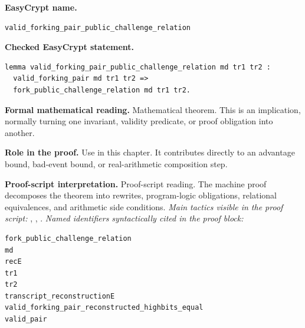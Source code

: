 \begin{formaltheorem}
\noindent\textbf{EasyCrypt name.}
\begin{lstlisting}[language=EasyCrypt,basicstyle=\ttfamily\scriptsize]
valid_forking_pair_public_challenge_relation
\end{lstlisting}
\noindent\textbf{Checked EasyCrypt statement.}
\begin{lstlisting}[language=EasyCrypt,basicstyle=\ttfamily\scriptsize]
lemma valid_forking_pair_public_challenge_relation md tr1 tr2 :
  valid_forking_pair md tr1 tr2 =>
  fork_public_challenge_relation md tr1 tr2.
\end{lstlisting}
\noindent\textbf{Formal mathematical reading.}
Mathematical theorem. This is an implication, normally turning one invariant, validity predicate, or proof obligation into another.

\noindent\textbf{Role in the proof.}
Use in this chapter. It contributes directly to an advantage bound, bad-event bound, or real-arithmetic composition step.

\noindent\textbf{Proof-script interpretation.}
Proof-script reading. The machine proof decomposes the theorem into rewrites, program-logic obligations, relational equivalences, and arithmetic side conditions.
\emph{Main tactics visible in the proof script:} , , .
\emph{Named identifiers syntactically cited in the proof block:}
\begin{lstlisting}[language=EasyCrypt,basicstyle=\ttfamily\scriptsize]
fork_public_challenge_relation
md
recE
tr1
tr2
transcript_reconstructionE
valid_forking_pair_reconstructed_highbits_equal
valid_pair
\end{lstlisting}

\end{formaltheorem}

